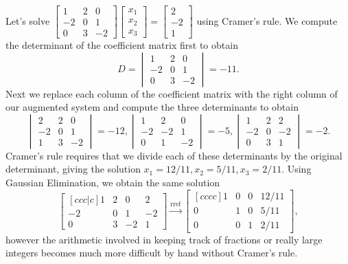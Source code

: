 \begin{example}
Let's solve $
\begin {bmatrix} 1&2&0\\-2&0&1\\0&3&-2\end {bmatrix} 
\begin {bmatrix} x_1\\x_2\\x_3\end {bmatrix} 
=  \begin{bmatrix} 2\\-2\\1\end {bmatrix}
$ using Cramer's rule.  
We compute the determinant of the coefficient matrix first to obtain
$$D=\begin{vmatrix} 1&2&0\\-2&0&1\\0&3&-2\end {vmatrix} = -11.$$ Next we replace each column of the coefficient matrix with the right column of our augmented system and compute the three determinants to obtain
$$
\begin{vmatrix} 2&2&0\\-2&0&1 \\1&3&-2\end {vmatrix}   =-12,
\begin{vmatrix} 1&2&0\\-2&-2&1 \\0&1&-2\end {vmatrix} =-5, 
\begin{vmatrix} 1&2&2\\-2&0&-2 \\0&3&1\end {vmatrix} =-2 .$$
Cramer's rule requires that we divide each of these determinants by the original determinant, giving the solution $x_1=12/11, x_2 = 5/11, x_3 = 2/11$.  Using Gaussian Elimination, we obtain the same solution 
$$ \begin {bmatrix}[ccc|c] 1&2&0&2\\-2&0&1&-2\\0&3&-2&1\end {bmatrix}\xrightarrow{\text{rref}}
\begin {bmatrix}[cccc] 1&0&0&12/11
\\0&1&0&5/11\\0&0&1&2/11\end {bmatrix} 
, $$
however the arithmetic involved in keeping track of fractions or really large integers becomes much more difficult by hand without Cramer's rule.
\end{example}


